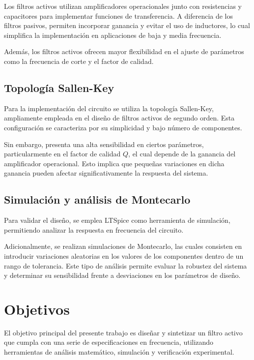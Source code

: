 \documentclass[12pt,a4paper]{article}
\begin{document}
Los filtros activos utilizan amplificadores operacionales junto con resistencias y capacitores para implementar funciones de transferencia. A diferencia de los filtros pasivos, permiten incorporar ganancia y evitar el uso de inductores, lo cual simplifica la implementación en aplicaciones de baja y media frecuencia.

Además, los filtros activos ofrecen mayor flexibilidad en el ajuste de parámetros como la frecuencia de corte y el factor de calidad.

\subsection{Topología Sallen-Key}

Para la implementación del circuito se utiliza la topología Sallen-Key, ampliamente empleada en el diseño de filtros activos de segundo orden. Esta configuración se caracteriza por su simplicidad y bajo número de componentes.

Sin embargo, presenta una alta sensibilidad en ciertos parámetros, particularmente en el factor de calidad \(Q\), el cual depende de la ganancia del amplificador operacional. Esto implica que pequeñas variaciones en dicha ganancia pueden afectar significativamente la respuesta del sistema.

\subsection{Simulación y análisis de Montecarlo}

Para validar el diseño, se emplea LTSpice como herramienta de simulación, permitiendo analizar la respuesta en frecuencia del circuito.

Adicionalmente, se realizan simulaciones de Montecarlo, las cuales consisten en introducir variaciones aleatorias en los valores de los componentes dentro de un rango de tolerancia. Este tipo de análisis permite evaluar la robustez del sistema y determinar su sensibilidad frente a desviaciones en los parámetros de diseño.


\section{Objetivos}

El objetivo principal del presente trabajo es diseñar y sintetizar un filtro activo que cumpla con una serie de especificaciones en frecuencia, utilizando herramientas de análisis matemático, simulación y verificación experimental.
\end{document}
